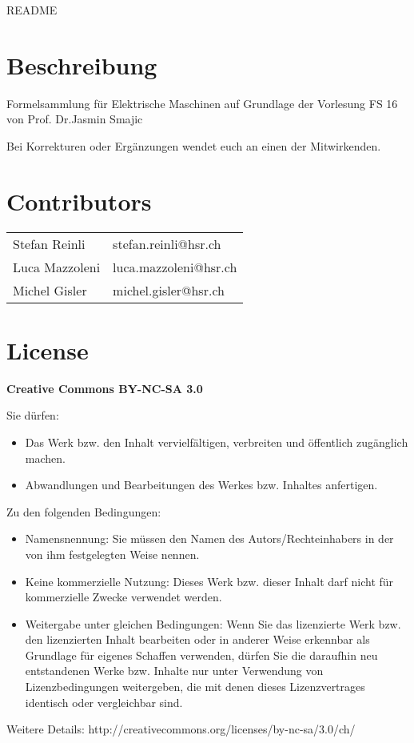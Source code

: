 \thispagestyle{empty}
{\huge README }
\section*{Beschreibung}
Formelsammlung für Elektrische Maschinen auf Grundlage der Vorlesung FS 16 von Prof. Dr.Jasmin Smajic \newline

Bei Korrekturen oder Ergänzungen wendet euch an einen der Mitwirkenden.
\section*{Contributors}
\begin{tabular}{ll}
    Stefan Reinli & stefan.reinli@hsr.ch \\ 
    Luca Mazzoleni& luca.mazzoleni@hsr.ch \\ 
    Michel Gisler& michel.gisler@hsr.ch \\ 
\end{tabular} 

\section*{License}
\textbf{Creative Commons BY-NC-SA 3.0}

Sie dürfen:
\begin{itemize}
    \item Das Werk bzw. den Inhalt vervielfältigen, verbreiten und öffentlich
    zugänglich machen.
    \item Abwandlungen und Bearbeitungen des Werkes bzw. Inhaltes anfertigen.
\end{itemize}
Zu den folgenden Bedingungen:
\begin{itemize}
    \item Namensnennung: Sie müssen den Namen des Autors/Rechteinhabers in der von ihm
    festgelegten Weise nennen.
    \item Keine kommerzielle Nutzung: Dieses Werk bzw. dieser Inhalt darf nicht für
    kommerzielle Zwecke verwendet werden.
    \item  Weitergabe unter gleichen Bedingungen: Wenn Sie das lizenzierte Werk bzw. den
    lizenzierten Inhalt bearbeiten oder in anderer Weise erkennbar als Grundlage
    für eigenes Schaffen verwenden, dürfen Sie die daraufhin neu entstandenen
    Werke bzw. Inhalte nur unter Verwendung von Lizenzbedingungen weitergeben,
    die mit denen dieses Lizenzvertrages identisch oder vergleichbar sind.
\end{itemize}
Weitere Details: http://creativecommons.org/licenses/by-nc-sa/3.0/ch/

\clearpage
{}%